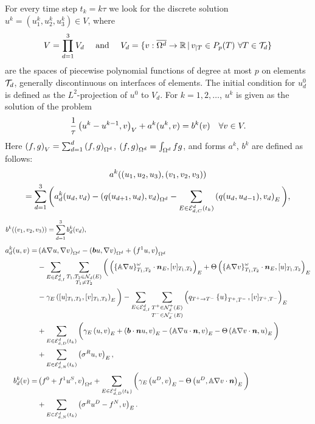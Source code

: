 For every time step $t_k=k\tau$ we look for the discrete solution $u^{k}=(u_1^{k},u_2^{k},u_3^{k})\in V$, where
$$ V=\prod_{d=1}^3 V_d \quad\mbox{ and }\quad V_d = \{v:\overline{\Omega^d}\to\R\where v_{|T}\in P_p(T)~\forall T\in\Td\} $$
are the spaces of piecewise polynomial functions of degree at most $p$ on elements $\Td$,
 generally discontinuous on interfaces of elements.
The initial condition for $u_d^{0}$ is defined as the $L^2$-projection of $u^0$ to $V_d$.
For $k=1,2,\ldots$, $u^{k}$ is given as the solution of the problem
\begin{equation*}
 \frac1\tau\sc{u^{k}-u^{k-1}}{v}_{V} + a^{k}(u^{k},v) = b^{k}(v) \quad \forall v\in V.
\end{equation*}
Here $\sc{f}{g}_{V}=\sum_{d=1}^d\sc{f}{g}_{\Omega^d}$, $\sc{f}{g}_{\Omega^d}=\int_{\Omega^d} f g$,
 and forms $a^{k}$, $b^{k}$
 are defined as follows:
\begin{multline}
\label{eq:df_ak_abstr_sys}
  a^{k}((u_1,u_2,u_3),(v_1,v_2,v_3))\\
   = \sum_{d=1}^3\bigg( a^{k}_d(u_d,v_d)
    - \sc{q(u_{d+1},u_d)}{v_d}_{\Omega^d}
    - \sum_{E\in\Ehcom^d(t_k)}\sc{q(u_d,u_{d-1})}{v_d}_E \bigg),
\end{multline}
\begin{equation}
\label{eq:df_bk_abstr_sys}
b^{k}((v_1,v_2,v_3)) = \sum_{d=1}^3 b^{k}_d(v_d), \mbox{\hspace{11.7cm}}
\end{equation}
\begin{align*}
 a^{k}_d(u,v) = &\sc{\tn A\nabla u}{\nabla v}_{\Omega^d}
 - \sc{\vc b u}{\nabla v}_{\Omega^d} + \sc{f^1 u}{v}_{\Omega^d}\\
 &- \sum_{E\in\Ehint^d}\sum_{\substack{T_1,T_2\in\Ngh(E)\\T_1\neq T_2}}\bigg(\sc{\wavg{\tn A\nabla u}{T_1}{T_2}\cdot\n_E}{\jmp{v}_{T_1,T_2}}_E + \Theta\sc{\wavg{\tn A\nabla v}{T_1}{T_2}\cdot\n_E}{\jmp{u}_{T_1,T_2}}_E \\
 &- \gamma_E\sc{\jmp{u}_{T_1,T_2}}{\jmp{v}_{T_1,T_2}}_E \bigg)
 - \sum_{E\in\Ehint^d}\sum_{\substack{T^+\in\Ngh^+(E)\\T^-\in\Ngh^-(E)}}\sc{q_{T^+\to T^-}\avg{u}_{T^+,T^-}}{\jmp{v}_{T^+,T^-}}_E\\
 &+ \sum_{E\in\Ehdir^d(t_k)}\bigg(\gamma_E\sc{u}{v}_E + \sc{\vc b\cdot\n u}{v}_E - \sc{\tn A\nabla u\cdot\vc n}{v}_E - \Theta\sc{\tn A\nabla v\cdot\vc n}{u}_E\bigg)\\
 &+ \sum_{E\in\Ehneu^d(t_k)}\sc{\sigma^R u}{v}_E,\\
% 
 b^{k}_d(v) = &\sc{f^0+f^1 u^S}{v}_{\Omega^d} + \sum_{E\in\Ehdir^d(t_k)}\bigg(\gamma_E\sc{u^D}{v}_E - \Theta\sc{u^D}{\tn A\nabla v\cdot\vc n}_E\bigg)\\
 & + \sum_{E\in\Ehneu^d(t_k)}\sc{\sigma^R u^D-f^N}{v}_E.
\end{align*}
